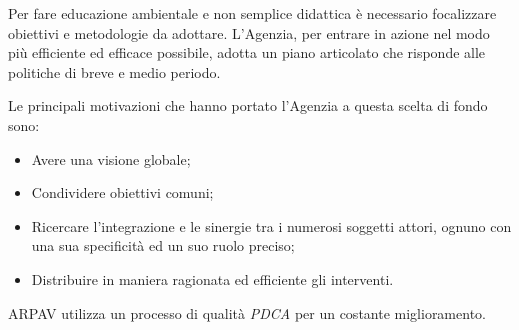 Per fare educazione ambientale e non semplice didattica è necessario focalizzare obiettivi e metodologie da adottare. L'Agenzia, per entrare in azione nel modo più efficiente ed efficace possibile, adotta un piano articolato che risponde alle politiche di breve e medio periodo.

Le principali motivazioni che hanno portato l'Agenzia a questa scelta di fondo sono:
\begin{itemize}
\item Avere una visione globale;
\item Condividere obiettivi comuni;
\item Ricercare l'integrazione e le sinergie tra i numerosi soggetti attori, ognuno con una sua specificità ed un suo ruolo preciso;
\item Distribuire in maniera ragionata ed efficiente gli interventi.
\end{itemize}

ARPAV utilizza un processo di qualità \textit{PDCA} per un costante miglioramento.

